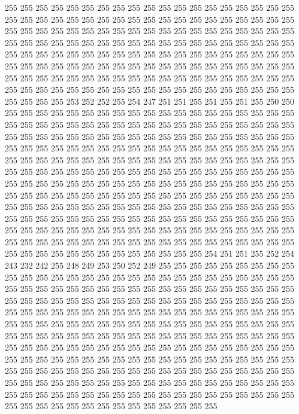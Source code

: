 255 255 255 255 255 255 255 255 255 255 255 255 255 255 255 255 255 255 255 255
255 255 255 255 255 255 255 255 255 255 255 255 255 255 255 255 255 255 255 255
255 255 255 255 255 255 255 255 255 255 255 255 255 255 255 255 255 255 255 255
255 255 255 255 255 255 255 255 255 255 255 255 255 255 255 255 255 255 255 255
255 255 255 255 255 255 255 255 255 255 255 255 255 255 255 255 255 255 255 255
255 255 255 255 255 255 255 255 255 255 255 255 255 255 255 255 255 255 255 255
255 255 255 255 255 255 255 255 255 255 255 255 255 255 255 255 255 255 255 255
255 255 255 255 255 255 255 255 255 255 255 255 255 255 255 255 253 252 252 255
254 247 251 251 255 251 255 251 255 250 250 255 255 255 255 255 255 255 255 255
255 255 255 255 255 255 255 255 255 255 255 255 255 255 255 255 255 255 255 255
255 255 255 255 255 255 255 255 255 255 255 255 255 255 255 255 255 255 255 255
255 255 255 255 255 255 255 255 255 255 255 255 255 255 255 255 255 255 255 255
255 255 255 255 255 255 255 255 255 255 255 255 255 255 255 255 255 255 255 255
255 255 255 255 255 255 255 255 255 255 255 255 255 255 255 255 255 255 255 255
255 255 255 255 255 255 255 255 255 255 255 255 255 255 255 255 255 255 255 255
255 255 255 255 255 255 255 255 255 255 255 255 255 255 255 255 255 255 255 255
255 255 255 255 255 255 255 255 255 255 255 255 255 255 255 255 255 255 255 255
255 255 255 255 255 255 255 255 255 255 255 255 255 255 255 255 255 255 255 255
255 255 255 255 255 255 255 255 255 255 255 255 255 255 255 255 255 255 255 255
255 255 255 255 255 255 255 255 255 255 255 255 255 255 255 255 255 255 255 255
255 255 255 255 255 255 255 255 255 255 255 255 254 251 251 255 252 254 243 232
242 255 248 249 253 250 252 249 255 255 255 255 255 255 255 255 255 255 255 255
255 255 255 255 255 255 255 255 255 255 255 255 255 255 255 255 255 255 255 255
255 255 255 255 255 255 255 255 255 255 255 255 255 255 255 255 255 255 255 255
255 255 255 255 255 255 255 255 255 255 255 255 255 255 255 255 255 255 255 255
255 255 255 255 255 255 255 255 255 255 255 255 255 255 255 255 255 255 255 255
255 255 255 255 255 255 255 255 255 255 255 255 255 255 255 255 255 255 255 255
255 255 255 255 255 255 255 255 255 255 255 255 255 255 255 255 255 255 255 255
255 255 255 255 255 255 255 255 255 255 255 255 255 255 255 255 255 255 255 255
255 255 255 255 255 255 255 255 255 255 255 255 255 255 255 255 255 255 255 255
255 255 255 255 255 255 255 255 255 255 255 255 255 255 255 255 255 255 255 255
255 255 255 255 255 255 255 255 255 255 255 255 255 255 255 255 255 255 255 255
255 255 255 255 255 255 255 255 255 255 255 255 255 255 255 255 255 255 255 255
